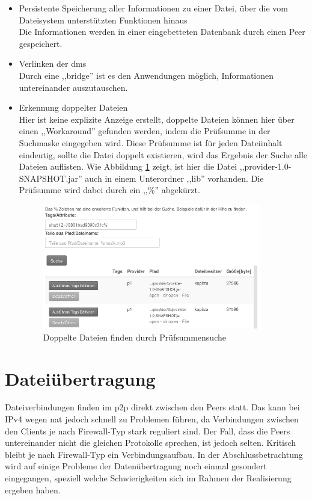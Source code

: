\documentclass[oneside, ngerman, toc=bibliography,bibliography=totoc,listof=entryprefix, open=right,numbers=noenddot,fontsize=12pt]{scrbook}
\begin{document}
\begin{itemize}
         
      \item Persistente Speicherung aller Informationen zu einer Datei, über die vom Dateisystem unterstützten Funktionen hinaus\\
      Die Informationen werden in einer eingebetteten Datenbank durch einen Peer gespeichert.
    \item Verlinken der \acrshort{dms}\\
    Durch eine ,,bridge'' ist es den Anwendungen möglich, Informationen untereinander auszutauschen. 
    \item Erkennung doppelter Dateien\\
    Hier ist keine explizite Anzeige erstellt, doppelte Dateien können hier über einen ,,Workaround'' gefunden werden, indem die Prüfsumme in der Suchmaske eingegeben wird. Diese Prüfsumme ist für jeden Dateiinhalt eindeutig, sollte die Datei doppelt existieren, wird das Ergebnis der Suche alle Dateien auflisten. Wie Abbildung \ref{fig:app-dups} zeigt, ist hier die Datei ,,provider-1.0-SNAPSHOT.jar'' auch in einem Unterordner ,,lib'' vorhanden. Die Prüfsumme wird dabei durch ein ,,\%'' abgekürzt.
    
    \begin{figure}[htbp] 
        \centering
        \includegraphics[width=0.9\textwidth]{Masterarbeit_Bilder/suchedups.png}
        \caption{Doppelte Dateien finden durch Prüfsummensuche}
        \label{fig:app-dups}
    \end{figure}  
    
    
    
\end{itemize}



\section{Dateiübertragung}
Dateiverbindungen finden im \acrshort{p2p} direkt zwischen den Peers statt.
Das kann bei IPv4 wegen \acrshort{nat} jedoch schnell zu Problemen führen, da Verbindungen zwischen den Clients je nach Firewall-Typ stark reguliert sind. Der Fall, dass die Peers untereinander nicht die gleichen Protokolle sprechen, ist jedoch selten. Kritisch bleibt je nach Firewall-Typ ein Verbindungsaufbau. In der Abschlussbetrachtung wird auf einige Probleme der Datenübertragung noch einmal gesondert eingegangen, speziell welche Schwierigkeiten sich im Rahmen der Realisierung ergeben haben.
\end{document}
